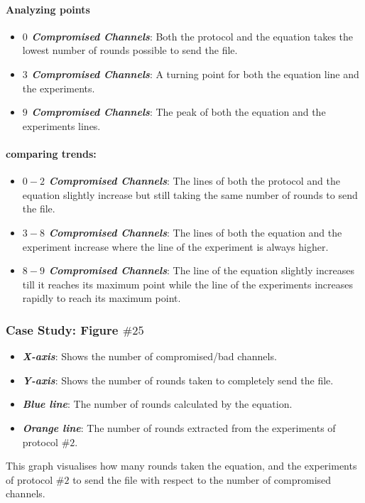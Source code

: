 \documentclass[main.tex]{subfiles}
\begin{document}
\paragraph{Analyzing points}
\begin{itemize}
\item \textbf{\textit{$0$ Compromised Channels}}: Both the protocol and the equation takes the lowest number of rounds possible to send the file.
\item \textbf{\textit{$3$ Compromised Channels}}: A turning point for both the equation line and the experiments.
\item \textbf{\textit{$9$ Compromised Channels}}: The peak of both the equation and the experiments lines.
\end{itemize}
\paragraph{comparing trends:}
\begin{itemize}
\item \textbf{\textit{$0-2$ Compromised Channels}}: The lines of both the protocol and the equation slightly increase but still taking the same number of rounds to send the file.
\item \textbf{\textit{$3-8$ Compromised Channels}}: The lines of both the equation and the experiment increase where the line of the experiment is always higher.
\item \textbf{\textit{$8-9$ Compromised Channels}}: The line of the equation slightly increases till it reaches its maximum point while the line of the experiments increases rapidly to reach its maximum point.
\end{itemize}

\subsubsection{Case Study: Figure $\#25$}
\begin{itemize}
\item \textbf{\textit{X-axis}}: Shows the number of compromised/bad channels.
\item \textbf{\textit{Y-axis}}: Shows the number of rounds taken to completely send the file.
\item \textbf{\textit{Blue line}}: The number of rounds calculated by the equation.
\item \textbf{\textit{Orange line}}: The number of rounds extracted from the experiments of protocol $\#2$.
\end{itemize}
This graph visualises how many rounds taken the equation, and the experiments of protocol $\#2$ to send the file with respect to the number of compromised channels.
\end{document}
